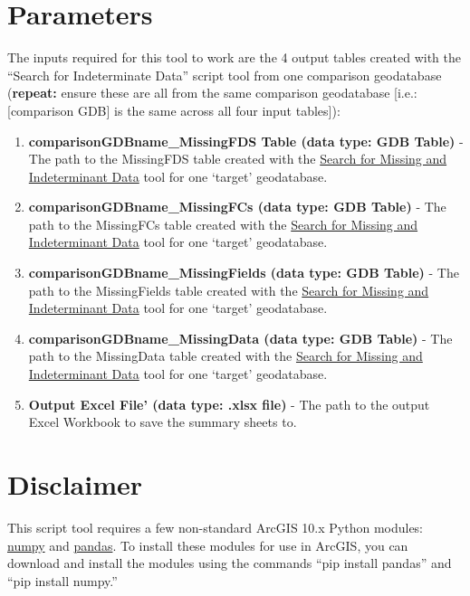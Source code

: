 \documentclass[openany]{book}
\providecommand{\tightlist}{%
  \setlength{\itemsep}{0pt}\setlength{\parskip}{0pt}}
\theoremstyle{definition}
\theoremstyle{definition}
\theoremstyle{definition}
\theoremstyle{remark}
\begin{document}
\section{Parameters}\label{parameters-8}

The inputs required for this tool to work are the 4 output tables
created with the ``Search for Indeterminate Data'' script tool from one
comparison geodatabase (\textbf{repeat:} ensure these are all from the
same comparison geodatabase {[}i.e.: {[}comparison GDB{]} is the same
across all four input tables{]}):

\begin{enumerate}
\def\labelenumi{\arabic{enumi}.}
\tightlist
\item
  \textbf{comparisonGDBname\_MissingFDS Table (data type: GDB Table)} -
  The path to the MissingFDS table created with the
  \protect\hyperlink{indtSearch}{Search for Missing and Indeterminant
  Data} tool for one `target' geodatabase.
\item
  \textbf{comparisonGDBname\_MissingFCs (data type: GDB Table)} - The
  path to the MissingFCs table created with the
  \protect\hyperlink{indtSearch}{Search for Missing and Indeterminant
  Data} tool for one `target' geodatabase.
\item
  \textbf{comparisonGDBname\_MissingFields (data type: GDB Table)} - The
  path to the MissingFields table created with the
  \protect\hyperlink{indtSearch}{Search for Missing and Indeterminant
  Data} tool for one `target' geodatabase.
\item
  \textbf{comparisonGDBname\_MissingData (data type: GDB Table)} - The
  path to the MissingData table created with the
  \protect\hyperlink{indtSearch}{Search for Missing and Indeterminant
  Data} tool for one `target' geodatabase.
\item
  \textbf{Output Excel File' (data type: .xlsx file)} - The path to the
  output Excel Workbook to save the summary sheets to.
\end{enumerate}

\section{Disclaimer}\label{disclaimer}

This script tool requires a few non-standard ArcGIS 10.x Python modules:
\href{http://www.numpy.org/}{numpy} and
\href{https://pandas.pydata.org/}{pandas}. To install these modules for
use in ArcGIS, you can download and install the modules using the
commands ``pip install pandas'' and ``pip install numpy.''
\end{document}
